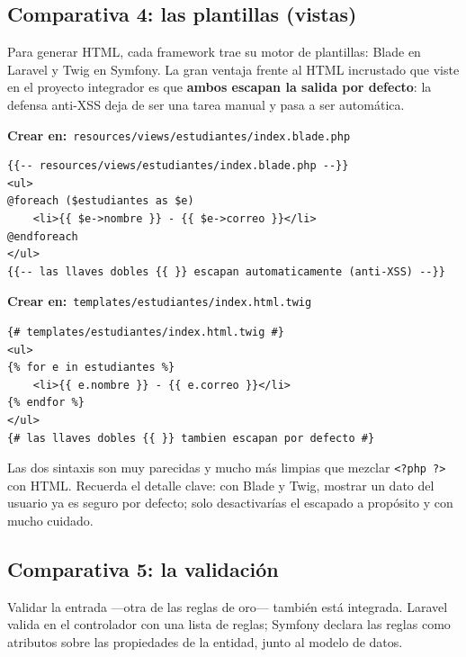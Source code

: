 \documentclass[11pt]{article}
\begin{document}
\subsection{Comparativa 4: las plantillas (vistas)}
Para generar HTML, cada framework trae su motor de plantillas: Blade en Laravel y Twig en Symfony. La gran ventaja frente al HTML incrustado que viste en el proyecto integrador es que \textbf{ambos escapan la salida por defecto}: la defensa anti-XSS deja de ser una tarea manual y pasa a ser automática.

{\small\color{phpazulo}\textbf{Crear en:}~}\texttt{resources/\allowbreak{}views/\allowbreak{}estudiantes/\allowbreak{}index.\allowbreak{}blade.\allowbreak{}php}\par\nobreak\vspace{-1pt}
\begin{cajacodigo}
\begin{lstlisting}[style=markup]
{{-- resources/views/estudiantes/index.blade.php --}}
<ul>
@foreach ($estudiantes as $e)
    <li>{{ $e->nombre }} - {{ $e->correo }}</li>
@endforeach
</ul>
{{-- las llaves dobles {{ }} escapan automaticamente (anti-XSS) --}}
\end{lstlisting}
\end{cajacodigo}
\vspace{2pt}
{\small\color{phpazulo}\textbf{Crear en:}~}\texttt{templates/\allowbreak{}estudiantes/\allowbreak{}index.\allowbreak{}html.\allowbreak{}twig}\par\nobreak\vspace{-1pt}
\begin{cajacodigo}
\begin{lstlisting}[style=markup]
{# templates/estudiantes/index.html.twig #}
<ul>
{% for e in estudiantes %}
    <li>{{ e.nombre }} - {{ e.correo }}</li>
{% endfor %}
</ul>
{# las llaves dobles {{ }} tambien escapan por defecto #}
\end{lstlisting}
\end{cajacodigo}
\vspace{2pt}
Las dos sintaxis son muy parecidas y mucho más limpias que mezclar \texttt{\textless{}?\allowbreak{}php ?\allowbreak{}\textgreater{}} con HTML. Recuerda el detalle clave: con Blade y Twig, mostrar un dato del usuario ya es seguro por defecto; solo desactivarías el escapado a propósito y con mucho cuidado.

\subsection{Comparativa 5: la validación}
Validar la entrada —otra de las reglas de oro— también está integrada. Laravel valida en el controlador con una lista de reglas; Symfony declara las reglas como atributos sobre las propiedades de la entidad, junto al modelo de datos.
\end{document}
